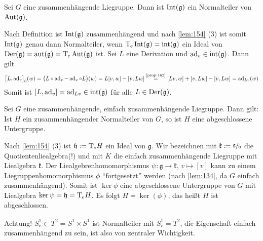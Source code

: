 \begin{lemma}[label=lem:165,{name=[Menge der inneren Automorphismen ist Normalteiler]}]
	Sei $G$ eine zusammenhängende Liegruppe.
	Dann ist $\Int(\mathfrak{g})$ ein Normalteiler von $\Aut(\mathfrak{g})$.
\end{lemma}
\begin{beweis}
	Nach Definition ist $\Int(\mathfrak{g})$ zusammenhängend und nach \autoref{lem:154} (3) ist somit $\Int(\mathfrak{g})$ genau dann Normalteiler, wenn $\Tmap_e \Int(\mathfrak{g}) = \intAlg(\mathfrak{g})$ ein Ideal von $\Der(\mathfrak{g})= \aut(\mathfrak{g}) = \Tmap_e \Aut(\mathfrak{g})$ ist.
	Sei $L$ eine Derivation und $\ad_v \in \intAlg(\mathfrak{g})$.
	Dann gilt
	\begin{align}
		\benbrace[\big]{L,\ad_v}_0 (w) = \enbrace[\big]{L \circ \ad_v - \ad_v \circ L}(w) = L \benbrace*{v,w}- \benbrace*{v,Lw} \StackText{\ref{prop:162}}{=} \benbrace*{Lv, w} + \benbrace*{v,Lw} - \benbrace*{v,Lw} 
		= \ad_{Lv}(w)
	\end{align}
	Somit ist $\benbrace*{L, \ad_v} = \ad_{Lv} \in \intAlg(\mathfrak{g})$ für alle $L \in \Der(\mathfrak{g})$.
\end{beweis}

\begin{lemma}[{name=[zusammenhängender Normalteiler]}]
	Sei $G$ eine zusammenhängende, einfach zusammenhängende Liegruppe.
	Dann gilt: Ist $H$ ein zusammenhängender Normalteiler von $G$, so ist $H$ eine abgeschlossene Untergruppe.
\end{lemma}
\begin{beweis}
	Nach \autoref{lem:154} (3) ist $\mathfrak{h} \coloneqq \Tmap_e H$ ein Ideal von $\mathfrak{g}$.
	Wir bezeichnen mit $\mathfrak{k} \coloneqq \sfrac{\mathfrak{g}}{\mathfrak{h}}$ die Quotientenliealgebra(!) und mit $K$ die einfach zusammenhängende Liegruppe mit Liealgebra $\mathfrak{k}$.
	Der Liealgebrenhomomorphismus $\psi \colon \mathfrak{g} \to \mathfrak{k}$, $v \mapsto [v]$ kann zu einem Liegruppenhomomorphismus $\phi$ \enquote{fortgesetzt} werden (nach \autoref{lem:134}, da $G$ einfach zusammenhängend).
	Somit ist $\ker \phi$ eine abgeschlossene Untergruppe von $G$ mit Liealgebra $\ker \psi= \mathfrak{h}= \Tmap_e H$.
	Es folgt $H= \ker (\phi)$, das heißt $H$ ist abgeschlossen.
\end{beweis}

Achtung! $S^1_r \subset T^2 = S^1 \times S^1$ ist Normalteiler mit $\overline{S^1_r}= T^2$, die Eigenschaft einfach zusammenhängend zu sein, ist also von zentraler Wichtigkeit.

